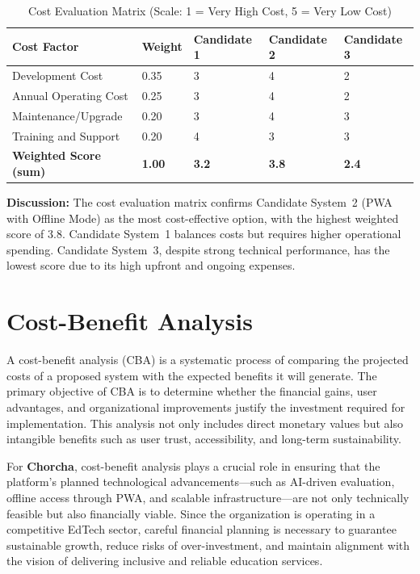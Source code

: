 \documentclass[12pt,a4paper,oneside]{book}
\begin{document}
\begin{table}[H]
\centering
\caption{Cost Evaluation Matrix (Scale: 1 = Very High Cost, 5 = Very Low Cost)}
\small
\begin{tabular}{|L{3.5cm}|C{1.8cm}|C{2.2cm}|C{2.2cm}|C{2.2cm}|}
\hline
\textbf{Cost Factor} & \textbf{Weight} & \textbf{Candidate 1} & \textbf{Candidate 2} & \textbf{Candidate 3} \\
\hline
Development Cost & 0.35 & 3 & 4 & 2 \\
\hline
Annual Operating Cost & 0.25 & 3 & 4 & 2 \\
\hline
Maintenance/Upgrade & 0.20 & 3 & 4 & 3 \\
\hline
Training and Support & 0.20 & 4 & 3 & 3 \\
\hline
\textbf{Weighted Score (sum)} & \textbf{1.00} & \textbf{3.2} & \textbf{3.8} & \textbf{2.4} \\
\hline
\end{tabular}
\end{table}

\textbf{Discussion:}
The cost evaluation matrix confirms Candidate System~2 (PWA with Offline Mode) as the most cost-effective option, with the highest weighted score of 3.8. Candidate System~1 balances costs but requires higher operational spending. Candidate System~3, despite strong technical performance, has the lowest score due to its high upfront and ongoing expenses.

\section{Cost-Benefit Analysis}

A cost-benefit analysis (CBA) is a systematic process of comparing the projected costs of a proposed system with the expected benefits it will generate. The primary objective of CBA is to determine whether the financial gains, user advantages, and organizational improvements justify the investment required for implementation. This analysis not only includes direct monetary values but also intangible benefits such as user trust, accessibility, and long-term sustainability.

For \textbf{Chorcha}, cost-benefit analysis plays a crucial role in ensuring that the platform’s planned technological advancements---such as AI-driven evaluation, offline access through PWA, and scalable infrastructure---are not only technically feasible but also financially viable. Since the organization is operating in a competitive EdTech sector, careful financial planning is necessary to guarantee sustainable growth, reduce risks of over-investment, and maintain alignment with the vision of delivering inclusive and reliable education services.
\end{document}
